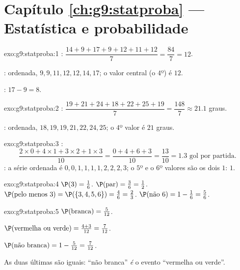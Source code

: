 \section*{Capítulo \ref{ch:g9:statproba} --- Estatística e probabilidade}

\begin{solution}{exo:g9:statproba:1}
: $\dfrac{14 + 9 + 17 + 9 + 12 + 11 + 12}{7} = \dfrac{84}{7} =
12$.

: ordenada, $9, 9, 11, 12, 12, 14, 17$; o valor central (o
$4$º) é $12$.

: $17 - 9 = 8$.
\end{solution}

\begin{solution}{exo:g9:statproba:2}
: $\dfrac{19 + 21 + 24 + 18 + 22 + 25 + 19}{7} = \dfrac{148}{7}
\approx 21.1$ graus.

: ordenada, $18, 19, 19, 21, 22, 24, 25$; o $4$º valor é $21$
graus.
\end{solution}

\begin{solution}{exo:g9:statproba:3}
:
\[
\frac{2 \times 0 + 4 \times 1 + 3 \times 2 + 1 \times 3}{10}
= \frac{0 + 4 + 6 + 3}{10} = \frac{13}{10} = 1.3
\text{ gol por partida.}
\]
: a série ordenada é $0,0,1,1,1,1,2,2,2,3$; o $5$º e o $6$º
valores são os dois $1$:  $1$.
\end{solution}

\begin{solution}{exo:g9:statproba:4}
$\P(3) = \frac16$. \quad
$\P(\text{par}) = \frac36 = \frac12$. \quad
$\P(\text{pelo menos } 3) = \P(\{3,4,5,6\}) = \frac46 = \frac23$. \quad
$\P(\text{não } 6) = 1 - \frac16 = \frac56$.
\end{solution}

\begin{solution}{exo:g9:statproba:5}
$\P(\text{branca}) = \frac{5}{12}$.

$\P(\text{vermelha ou verde}) = \frac{4 + 3}{12} = \frac{7}{12}$.

$\P(\text{não branca}) = 1 - \frac{5}{12} = \frac{7}{12}$.

As duas últimas são iguais: ``não branca'' \emph{é} o evento
``vermelha ou verde''.
\end{solution}

